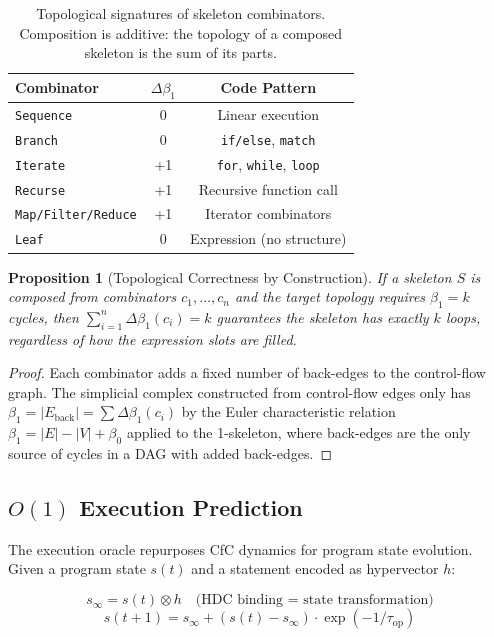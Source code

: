 \documentclass[11pt,a4paper]{article}
\newtheorem{proposition}{Proposition}
\begin{document}
\begin{table}[h]
\centering
\begin{tabular}{lcc}
\toprule
\textbf{Combinator} & $\Delta\beta_1$ & \textbf{Code Pattern} \\
\midrule
\texttt{Sequence} & 0 & Linear execution \\
\texttt{Branch} & 0 & \texttt{if/else}, \texttt{match} \\
\texttt{Iterate} & +1 & \texttt{for}, \texttt{while}, \texttt{loop} \\
\texttt{Recurse} & +1 & Recursive function call \\
\texttt{Map/Filter/Reduce} & +1 & Iterator combinators \\
\texttt{Leaf} & 0 & Expression (no structure) \\
\bottomrule
\end{tabular}
\caption{Topological signatures of skeleton combinators. Composition is additive:
the topology of a composed skeleton is the sum of its parts.}
\label{tab:signatures}
\end{table}

\begin{proposition}[Topological Correctness by Construction]
If a skeleton $S$ is composed from combinators $c_1, \ldots, c_n$ and the target
topology requires $\beta_1 = k$ cycles, then
$\sum_{i=1}^{n} \Delta\beta_1(c_i) = k$ guarantees the skeleton has exactly $k$
loops, regardless of how the expression slots are filled.
\end{proposition}

\begin{proof}
Each combinator adds a fixed number of back-edges to the control-flow graph.
The simplicial complex constructed from control-flow edges only has
$\beta_1 = |E_{\text{back}}| = \sum \Delta\beta_1(c_i)$ by the Euler characteristic
relation $\beta_1 = |E| - |V| + \beta_0$ applied to the 1-skeleton, where
back-edges are the only source of cycles in a DAG with added back-edges.
\end{proof}

\subsection{$O(1)$ Execution Prediction}

The execution oracle repurposes CfC dynamics for program state evolution.
Given a program state $s(t)$ and a statement encoded as hypervector $h$:

\begin{equation}
    s_\infty = s(t) \otimes h \quad \text{(HDC binding = state transformation)}
\end{equation}
\begin{equation}
    s(t+1) = s_\infty + (s(t) - s_\infty) \cdot \exp(-1/\tau_{\text{op}})
\end{equation}
\end{document}

